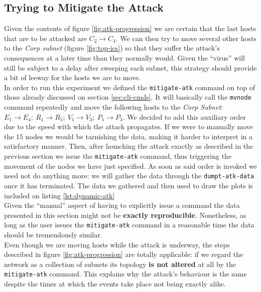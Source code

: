             

        \subsection{Trying to Mitigate the Attack}
            Given the contents of figure \ref{fig:atk-progression} we are certain that the last hosts that are to be attacked are $C_2 \to C_4$. We can then try to move several other hosts to the \textit{Corp subnet} (figure \ref{fig:top-ics}) so that they suffer the attack's consequences at a later time than they normally would. Given the ``virus'' will still be subject to a delay after sweeping each subnet, this strategy should provide a bit of leeway for the hosts we are to move.\\

            In order to run this experiment we defined the \texttt{mitigate-atk} command on top of those already discussed on section \ref{sec:cli-cmds}. It will basically call the \texttt{mvnode} command repeatedly and move the following hosts to the \textit{Corp Subnet}: $E_1 \to E_4;\ R_1 \to R_5;\ V_1 \to V_3;\ P_1 \to P_3$. We decided to add this auxiliary order due to the speed with which the attack propagates. If we were to manually move the $15$ nodes we would be tarnishing the data, making it harder to interpret in a satisfactory manner. Then, after launching the attack exactly as described in the previous section we issue the \texttt{mitigate-atk} command, thus triggering the movement of the nodes we have just specified. As soon as said order is invoked we need not do anything more: we will gather the data through the \texttt{dumpt-atk-data} once it has terminated. The data we gathered and then used to draw the plots is included on listing \ref{lst:dynamic-atk}\\

            Given the ``manual'' aspect of having to explicitly issue a command the data presented in this section might not be \textbf{exactly reproducible}. Nonetheless, as long as the user issues the \texttt{mitigate-atk} command in a reasonable time the data should be tremendously similar.\\

            Even though we are moving hosts while the attack is underway, the steps described in figure \ref{fig:atk-progression} are totally applicable: if we regard the network as a collection of subnets its topology \textbf{is not altered} at all by the \texttt{mitigate-atk} command. This explains why the attack's behaviour is the same despite the times at which the events take place not being exactly alike.\\

